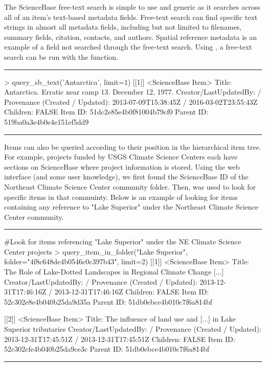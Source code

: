 The ScienceBase free-text search is simple to use and generic as it 
searches across all of an item's text-based metadata fields. Free-text 
search can find specific text strings in almost all metadata fields, including 
but not limited to filenames, summary fields, citation, contacts, and authors. 
Spatial reference metadata is an example of a field not searched through the 
free-text search. Using , a free-text 
search can be run with the  function.

\noindent\rule{\textwidth}{0.4pt}
\begin{example}
> query_sb_text('Antarctica', limit=1)
[[1]]
<ScienceBase Item> 
  Title: Antarctica. Erratic near camp 13. December 12, 1977.
  Creator/LastUpdatedBy:      / 
  Provenance (Created / Updated):  2013-07-09T15:38:45Z / 2016-03-02T23:55:43Z
  Children: FALSE
  Item ID: 51dc2e85e4b0f81004b79cf0
  Parent ID: 519ba0a3e4b0e4e151ef5dd9
\end{example}
\noindent\rule{\textwidth}{0.4pt}

Items can also be queried according to their position in the hierarchical item
tree. For example, projects funded by USGS Climate Science Centers each have sections on ScienceBase
where project information is stored. Using the web interface (and some user knowledge), we first found the
ScienceBase ID of the Northeast Climate Science Center community folder. Then,  was used 
to look for specific items in that commuinty. Below is an example of looking for 
items containing any reference to "Lake Superior" under the Northeast Climate Science Center community. 

\noindent\rule{\textwidth}{0.4pt}
\begin{example}
#Look for items referencing "Lake Superior" under the NE Climate Science Center projects
> query_item_in_folder("Lake Superior", folder="4f8c648de4b0546c0c397b43", limit=2)
[[1]]	
<ScienceBase Item> 
  Title: The Role of Lake-Dotted Landscapes in Regional Climate Change [...]
  Creator/LastUpdatedBy:      / 
  Provenance (Created / Updated):  2013-12-31T17:46:16Z / 2013-12-31T17:46:16Z
  Children: FALSE	
  Item ID: 52c302e8e4b040b25da9d35a
  Parent ID: 51db0ebce4b010c7f6a814bf

[[2]]
<ScienceBase Item> 
  Title: The influence of land use and [...] in Lake Superior tributaries
  Creator/LastUpdatedBy:      / 
  Provenance (Created / Updated):  2013-12-31T17:45:51Z / 2013-12-31T17:45:51Z
  Children: FALSE
  Item ID: 52c302cfe4b040b25da9ce3c
  Parent ID: 51db0ebce4b010c7f6a814bf
\end{example}
\noindent\rule{\textwidth}{0.4pt}

